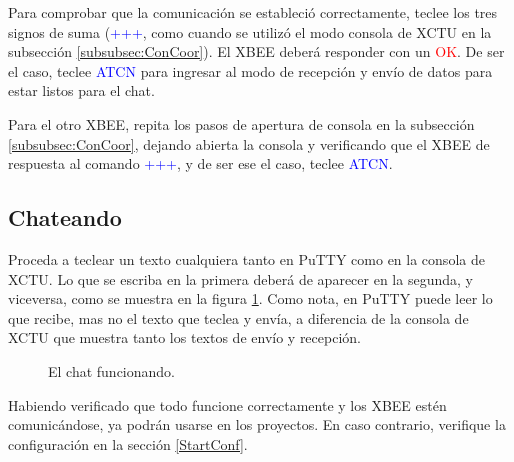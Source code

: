 Para comprobar que la comunicación se estableció correctamente, teclee los tres signos de suma (\textcolor{blue}{+++}, como cuando se utilizó el modo consola de XCTU en la subsección \ref{subsubsec:ConCoor}). El XBEE deberá responder con un \textcolor{red}{OK}. De ser el caso, teclee \textcolor{blue}{ATCN} para ingresar al modo de recepción y envío de datos para estar listos para el chat. 

Para el otro XBEE, repita los pasos de apertura de consola en la subsección \ref{subsubsec:ConCoor}, dejando abierta la consola y verificando que el XBEE de respuesta al comando \textcolor{blue}{+++}, y de ser ese el caso, teclee \textcolor{blue}{ATCN}. 

\subsection{Chateando}

Proceda a teclear un texto cualquiera tanto en PuTTY como en la consola de XCTU. Lo que se escriba en la primera deberá de aparecer en la segunda, y viceversa, como se muestra en la figura \ref{fig:Fin}. Como nota, en PuTTY puede leer lo que recibe, mas no el texto que teclea y envía, a diferencia de la consola de XCTU que muestra tanto los textos de envío y recepción. 

\begin{figure}[H] %
\caption[1]{El chat funcionando.}
\label{fig:Fin}
\end{figure}

Habiendo verificado que todo funcione correctamente y los XBEE estén comunicándose, ya podrán usarse en los proyectos. En caso contrario, verifique la configuración en la sección \ref{StartConf}.
%